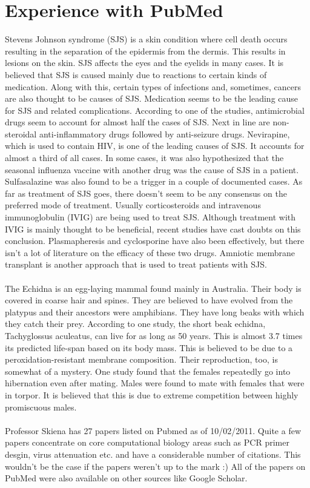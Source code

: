 \documentclass{article}
\begin{document}
\section{Experience with PubMed}
Stevens Johnson syndrome (SJS) is a skin condition where cell death occurs resulting in the separation of the epidermis from the dermis. This results in lesions on the skin. SJS affects the eyes and the eyelids in many cases. It is believed that SJS is caused mainly due to reactions to certain kinds of medication. Along with this, certain types of infections and, sometimes, cancers are also thought to be causes of SJS. Medication seems to be the leading cause for SJS and related complications. According to one of the studies, antimicrobial drugs seem to account for almost half the cases of SJS. Next in line are non-steroidal anti-inflammatory drugs followed by anti-seizure drugs. Nevirapine, which is used to contain HIV, is one of the leading causes of SJS. It accounts for almost a third of all cases. In some cases, it was also hypothesized that the seasonal influenza vaccine with another drug was the cause of SJS in a patient. Sulfasalazine was also found to be a trigger in a couple of documented cases. 
As far as treatment of SJS goes, there doesn't seem to be any consensus on the preferred mode of treatment. Usually corticosteroids and intravenous immunoglobulin (IVIG) are being used to treat SJS. Although treatment with IVIG is mainly thought to be beneficial, recent studies have cast doubts on this conclusion. Plasmapheresis and cyclosporine have also been effectively, but there isn't a lot of literature on the efficacy of these two drugs. Amniotic membrane transplant is another approach that is used to treat patients with SJS. \\
\\
The Echidna is an egg-laying mammal found mainly in Australia. Their body is covered in coarse hair and spines. They are believed to have evolved from the platypus and their ancestors were amphibians. They have long beaks with which they catch their prey. According to one study, the short beak echidna, Tachyglossus aculeatus, can live for as long as 50 years. This is almost 3.7 times its predicted life-span based on its body mass. This is believed to be due to a peroxidation-resistant membrane composition. Their reproduction, too, is somewhat of a mystery. One study found that the females repeatedly go into hibernation even after mating. Males were found to mate with females that were in torpor. It is believed that this is due to extreme competition between highly promiscuous males. \\
\\
Professor Skiena has 27 papers listed on Pubmed as of 10/02/2011. Quite a few papers concentrate on core computational biology areas such as PCR primer desgin, virus attenuation etc. and have a considerable number of citations. This wouldn't be the case if the papers weren't up to the mark :) All of the papers on PubMed were also available on other sources like Google Scholar. 
\clearpage
\end{document}
